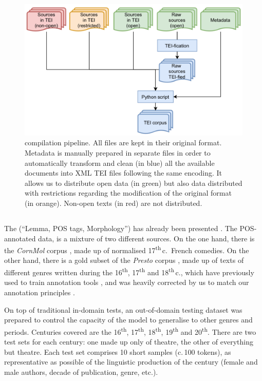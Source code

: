 \begin{figure}[ht]
    \centering
    \includegraphics[width=1\linewidth]{static/media/mod_eval/dalembert/corpus_trans.png}
    \caption{\freemmax compilation pipeline. All files are kept in their original format. Metadata is manually prepared in separate files in order to automatically transform and clean (in blue) all the available documents into XML TEI files following the same encoding. It allows us to distribute open data (in green) but also data distributed with restrictions regarding the modification of the original format (in orange). Non-open texts (in red) are not distributed.}
    \label{fig:pipeline}
\end{figure}

\subsection{\texorpdfstring{\freemlpm}{FREEM LPM}}\label{freem_lpm}

The \freemlpm (``Lemma, POS tags, Morphology'') has already been presented \cite{gabay-etal-2020-standardizing}. The POS-annotated data, is a mixture of two different sources. On the one hand, there is the \emph{CornMol} corpus \cite{camps-etal-2021-corpus}, made up of normalised 17\textsuperscript{th}\,c.~French comedies. On the other hand, there is a gold subset of the \emph{Presto} corpus \cite{blumenthal-etal-2017-presto}, made up of texts of different genres written during the 16\textsuperscript{th}, 17\textsuperscript{th} and 18\textsuperscript{th}\,c., which have previously used to train annotation tools \cite{diwersy-etal-2017-ressources}, and was heavily corrected by us to match our annotation principles \cite{gabay-etal-2020-manuel}.

On top of traditional in-domain tests, an out-of-domain testing dataset was prepared to control the capacity of the model to generalise to other genres and periods. Centuries covered are the 16\textsuperscript{th}, 17\textsuperscript{th}, 18\textsuperscript{th}, 19\textsuperscript{th} and 20\textsuperscript{th}. There are two test sets for each century: one made up only of theatre, the other of everything but theatre. Each test set comprises 10 short samples (c.\,100 tokens), as representative as possible of the linguistic production of the century (female and male authors, decade of publication, genre, etc.).

